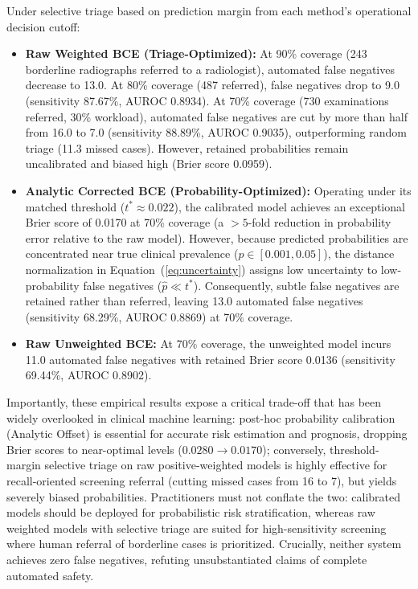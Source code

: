 \documentclass[journal]{IEEEtran}
\begin{document}
Under selective triage based on prediction margin from each method's operational decision cutoff:
\begin{itemize}
    \item \textbf{Raw Weighted BCE (Triage-Optimized):} At 90\% coverage (243 borderline radiographs referred to a radiologist), automated false negatives decrease to 13.0. At 80\% coverage (487 referred), false negatives drop to 9.0 (sensitivity 87.67\%, AUROC 0.8934). At 70\% coverage (730 examinations referred, 30\% workload), automated false negatives are cut by more than half from 16.0 to 7.0 (sensitivity 88.89\%, AUROC 0.9035), outperforming random triage (11.3 missed cases). However, retained probabilities remain uncalibrated and biased high (Brier score 0.0959).
    \item \textbf{Analytic Corrected BCE (Probability-Optimized):} Operating under its matched threshold ($t^* \approx 0.022$), the calibrated model achieves an exceptional Brier score of 0.0170 at 70\% coverage (a $>5$-fold reduction in probability error relative to the raw model). However, because predicted probabilities are concentrated near true clinical prevalence ($p \in [0.001, 0.05]$), the distance normalization in Equation~(\ref{eq:uncertainty}) assigns low uncertainty to low-probability false negatives ($\hat{p} \ll t^*$). Consequently, subtle false negatives are retained rather than referred, leaving 13.0 automated false negatives (sensitivity 68.29\%, AUROC 0.8869) at 70\% coverage.
    \item \textbf{Raw Unweighted BCE:} At 70\% coverage, the unweighted model incurs 11.0 automated false negatives with retained Brier score 0.0136 (sensitivity 69.44\%, AUROC 0.8902).
\end{itemize}

Importantly, these empirical results expose a critical trade-off that has been widely overlooked in clinical machine learning: post-hoc probability calibration (Analytic Offset) is essential for accurate risk estimation and prognosis, dropping Brier scores to near-optimal levels ($0.0280 \to 0.0170$); conversely, threshold-margin selective triage on raw positive-weighted models is highly effective for recall-oriented screening referral (cutting missed cases from 16 to 7), but yields severely biased probabilities. Practitioners must not conflate the two: calibrated models should be deployed for probabilistic risk stratification, whereas raw weighted models with selective triage are suited for high-sensitivity screening where human referral of borderline cases is prioritized. Crucially, neither system achieves zero false negatives, refuting unsubstantiated claims of complete automated safety.
\end{document}
